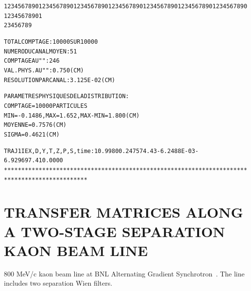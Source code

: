 \begin{tiny}
\begin{center}
\begin{alltt}
            123456789012345678901234567890123456789012345678901234567890123456789012345678901
                     2         3         4         5         6         7         8         9

                  
        TOTAL  COMPTAGE                 :   10000  SUR  10000
        NUMERO   DU  CANAL  MOYEN       :      51
        COMPTAGE  AU   "      "         :     246
        VAL. PHYS. AU  "      "         :  0.750     (CM) 
        RESOLUTION  PAR  CANAL          :  3.125E-02 (CM) 
             
        PARAMETRES  PHYSIQUES  DE  LA  DISTRIBUTION :
                      COMPTAGE =  10000  PARTICULES
                      MIN = -0.1486    , MAX =   1.652    , MAX-MIN =   1.800     (CM) 
                      MOYENNE =  0.7576     (CM) 
                      SIGMA =  0.4621     (CM) 

 TRAJ 1 IEX,D,Y,T,Z,P,S,time :  1  0.9980 0.2475 74.43 -6.2488E-03 -6.929   697.41 0.0000    
**********************************************************************************************
\end{alltt}

\onecolumn
\end{center}
\end{tiny}

\clearpage



\section{TRANSFER MATRICES ALONG A TWO-STAGE SEPARATION KAON BEAM LINE}

\medskip

800 MeV/c kaon beam line at BNL Alternating Gradient Synchrotron~\cite{BNL}. The  line includes 
two separation Wien filters.  

\vfill

